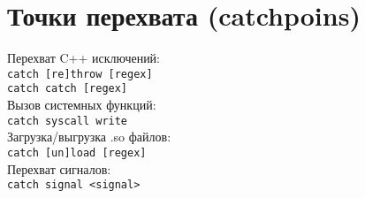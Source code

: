 \section{Точки перехвата (catchpoins)}

\noindent Перехват C++ исключений: \\
\indent \texttt{catch [re]throw [regex] } \\
\indent \texttt{catch catch [regex]} \\
\noindent Вызов системных функций: \\
\indent \texttt{catch syscall write} \\
\noindent Загрузка/выгрузка .so файлов: \\
\indent \texttt{catch [un]load [regex]} \\
\noindent Перехват сигналов: \\
\indent \texttt{catch signal <signal>}

